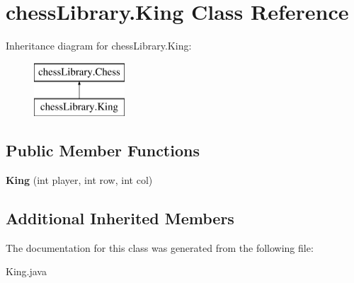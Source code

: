 \hypertarget{classchess_library_1_1_king}{}\section{chess\+Library.\+King Class Reference}
\label{classchess_library_1_1_king}
Inheritance diagram for chess\+Library.\+King\+:\begin{figure}[H]
\begin{center}
\leavevmode
\includegraphics[height=2.000000cm]{classchess_library_1_1_king}
\end{center}
\end{figure}
\subsection*{Public Member Functions}
\begin{DoxyCompactItemize}
\item 
\mbox{\label{classchess_library_1_1_king_aaf639a04c3d7b3a724229a56c2c5208d}} 
{\bfseries King} (int player, int row, int col)
\end{DoxyCompactItemize}
\subsection*{Additional Inherited Members}


The documentation for this class was generated from the following file\+:\begin{DoxyCompactItemize}
\item 
King.\+java\end{DoxyCompactItemize}
